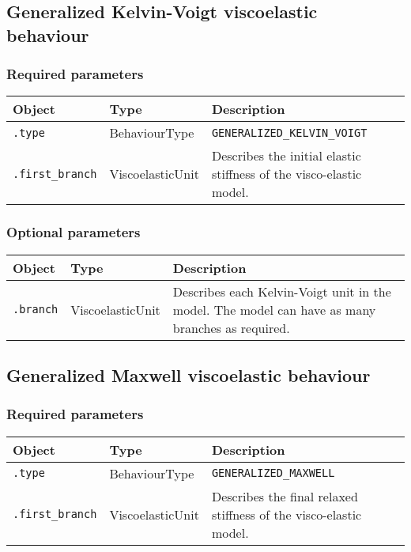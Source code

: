 \documentclass[10pt]{article}
\begin{document}
\subsection{Generalized Kelvin-Voigt viscoelastic behaviour}

\subsubsection*{Required parameters}

\begin{tabularx}{\textwidth}{llX}
\hline 
Object & Type & Description \\ 
\hline 
\verb+.type+ & BehaviourType & \verb+GENERALIZED_KELVIN_VOIGT+ \\ 
\verb+.first_branch+ & ViscoelasticUnit & Describes the initial elastic stiffness of the visco-elastic model. \\ 
\hline 
\end{tabularx}

\subsubsection*{Optional parameters}

\begin{tabularx}{\textwidth}{llX}
\hline 
Object & Type & Description \\ 
\hline 
\verb+.branch+ & ViscoelasticUnit & Describes each Kelvin-Voigt unit in the model. The model can have as many branches as required. \\ 
\hline 
\end{tabularx}

\subsection{Generalized Maxwell viscoelastic behaviour}

\subsubsection*{Required parameters}

\begin{tabularx}{\textwidth}{llX}
\hline 
Object & Type & Description \\ 
\hline 
\verb+.type+ & BehaviourType & \verb+GENERALIZED_MAXWELL+ \\ 
\verb+.first_branch+ & ViscoelasticUnit & Describes the final relaxed stiffness of the visco-elastic model. \\ 
\hline 
\end{tabularx}
\end{document}
